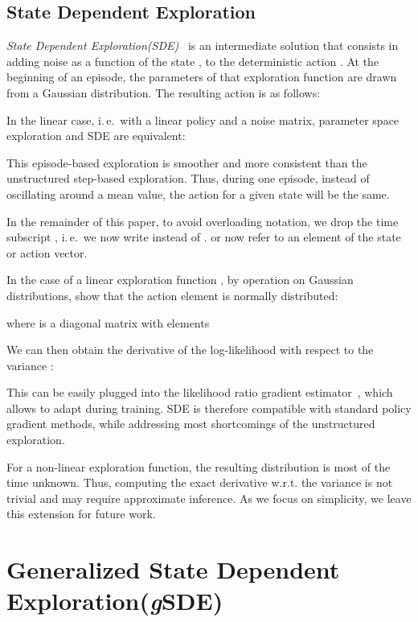 \documentclass{article}
\newcommand{\ie}{i.\,e.\ }
\newcommand{\sde}{State Dependent Exploration\xspace}
\newcommand{\SDE}{\textsc{SDE}\xspace}
\newcommand{\ourSDE}{\textit{g}\textsc{SDE}\xspace}
\begin{document}
\subsection{State Dependent Exploration}
\label{sec:sde}


\textit{\sde(\SDE)}~\citep{ruckstiess2008state, ruckstiess2010exploring} is an intermediate solution that consists in adding noise as a function of the state , to the deterministic action . At the beginning of an episode, the parameters  of that exploration function are drawn from a Gaussian distribution. The resulting action  is as follows:



In the linear case, \ie with a linear policy and a noise matrix, parameter space exploration and \SDE are equivalent:



This episode-based exploration is smoother and more consistent than the unstructured step-based exploration. Thus, during one episode, instead of oscillating around a mean value, the action  for a given state  will be the same.


In the remainder of this paper, to avoid overloading notation, we drop the time subscript , \ie we now write  instead of .  or  now refer to an element of the state or action vector.

In the case of a linear exploration function , by operation on Gaussian distributions, \citet{ruckstiess2008state} show that the action element  is normally distributed:



where  is a diagonal matrix with elements 

We can then obtain the derivative of the log-likelihood  with respect to the variance :




This can be easily plugged into the likelihood ratio gradient estimator~\citep{williams1992simple}, which allows to adapt  during training.
\SDE is therefore compatible with standard policy gradient methods, while addressing most shortcomings of the unstructured exploration.

For a non-linear exploration function, the resulting distribution  is most of the time unknown. Thus, computing the exact derivative w.r.t. the variance is not trivial and may require approximate inference. As we focus on simplicity, we leave this extension for future work.

\section{Generalized \sde (\ourSDE)}
\end{document}
